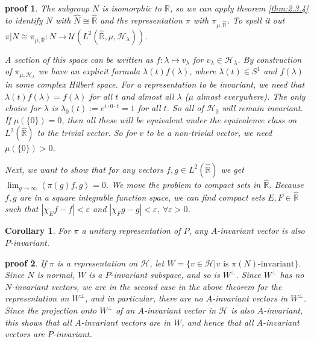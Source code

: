 \documentclass[
  12pt
]{article}
\theoremstyle{break}
\theoremstyle{plain}
\newtheorem{cor}[thm]{Corollary}
\newtheorem*{pf}{proof}
\newcommand{\mpi}{\ensuremath{\pi}\xspace}
\newcommand{\bbr}{\ensuremath{\mathbb{R}}\xspace}
\newcommand{\hilb}{\ensuremath{\mathscr{H}}\xspace}
\newcommand{\abs}[1]{| #1 |}
\newcommand{\inn}[1]{\left\langle #1 \right\rangle}
\begin{document}
  \begin{pf}
    The subgroup $N$ is isomorphic to \bbr, so we can apply theorem \autoref{thm:2.3.4}
    to identify $N$ with $\hat{N} \cong \hat{\bbr}$ and the representation \mpi with $\pi_{\mu, \hat{\bbr}}$.
    To spell it out $\pi|N \cong \pi_{\mu, \hat{\bbr}}: N \rightarrow \mathcal{U}(L^2(\hat{\bbr}, \mu, \hilb_{\lambda}))$.

    A section of this space can be written as $f: \lambda \mapsto v_{\lambda}$ for $v_{\lambda} \in \hilb_{\lambda}$.
    By construction of $\pi_{\mu, \hilb_{\lambda}}$ we have an explicit formula $\lambda(t)f(\lambda)$, where $\lambda(t) \in S^1$ and $f(\lambda)$ in some complex Hilbert space.
    For a representation to be invariant, we need that $\lambda(t)f(\lambda) = f(\lambda)$ for all $t$ and almost all $\lambda$ ($\mu$ almost everywhere).
    The only choice for $\lambda$ is $\lambda_0(t) := e^{i \cdot 0 \cdot t} = 1$ for all $t$.
    So all of $\hilb_0$ will remain invariant.
    If $\mu(\{0\}) = 0$, then all these will be equivalent under the equivalence class on $L^2(\hat{\bbr})$ to the trivial vector.
    So for $v$ to be a non-trivial vector, we need $\mu(\{0\}) > 0$.

    Next, we want to show that for any vectors $f, g \in L^2(\hat{\bbr})$ we get $\lim_{g\to\infty} \inn{\pi(g)f,g} = 0$.
    We move the problem to compact sets in $\hat{\bbr}$.
    Because $f,g$ are in a square integrable function space, we can find compact sets $E, F \in \hat{\bbr}$ such that $\abs{\chi_Ef - f} < \varepsilon$ and $\abs{\chi_Fg -g} < \varepsilon$, $\forall \varepsilon > 0$.


  \end{pf}


  \begin{cor}
    \label{cor:2.3.7}
    For \mpi a unitary representation of $P$, any $A$-invariant vector is also $P$-invariant.
  \end{cor}

  \begin{pf}
    If \mpi is a representation on \hilb, let $W=\{v \in \hilb|v \text{ is } \pi(N)\text{-invariant}\}$.
    Since $N$ is normal, $W$ is a $P$-invariant subspace, and so is $W^{\perp}$. 
    Since $W^{\perp}$ has no $N$-invariant vectors, we are in the second case
    in the above theorem for the representation on $W^{\perp}$, and in
    particular, there are no $A$-invariant vectors in $W^{\perp}$. Since the
    projection onto $W^{\perp}$ of an $A$-invariant vector in \hilb is also
    $A$-invariant, this shows that all $A$-invariant vectors are in $W$, and
    hence that all $A$-invariant vectors are $P$-invariant.
  \end{pf}
\end{document}
